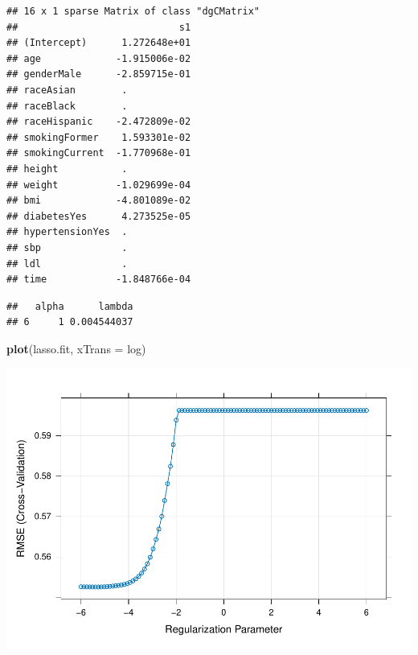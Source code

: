 \documentclass[
]{article}
\newenvironment{Shaded}{\begin{snugshade}}{\end{snugshade}}
\newcommand{\AttributeTok}[1]{\textcolor[rgb]{0.13,0.29,0.53}{#1}}
\newcommand{\FunctionTok}[1]{\textcolor[rgb]{0.13,0.29,0.53}{\textbf{#1}}}
\newcommand{\NormalTok}[1]{#1}
\newcommand{\SpecialCharTok}[1]{\textcolor[rgb]{0.81,0.36,0.00}{\textbf{#1}}}
\begin{document}
\begin{verbatim}
## 16 x 1 sparse Matrix of class "dgCMatrix"
##                            s1
## (Intercept)      1.272648e+01
## age             -1.915006e-02
## genderMale      -2.859715e-01
## raceAsian        .           
## raceBlack        .           
## raceHispanic    -2.472809e-02
## smokingFormer    1.593301e-02
## smokingCurrent  -1.770968e-01
## height           .           
## weight          -1.029699e-04
## bmi             -4.801089e-02
## diabetesYes      4.273525e-05
## hypertensionYes  .           
## sbp              .           
## ldl              .           
## time            -1.848766e-04
\end{verbatim}

\begin{Shaded}
\end{Shaded}

\begin{verbatim}
##   alpha      lambda
## 6     1 0.004544037
\end{verbatim}

\begin{Shaded}
\begin{Highlighting}[]
\FunctionTok{plot}\NormalTok{(lasso.fit, }\AttributeTok{xTrans =}\NormalTok{ log)}
\end{Highlighting}
\end{Shaded}

\includegraphics{p8106_midterm_project_files/figure-latex/unnamed-chunk-17-1.pdf}
\end{document}
